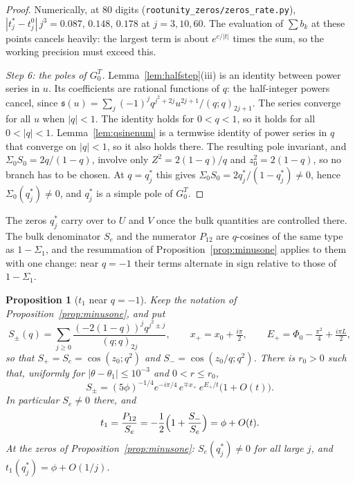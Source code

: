 \documentclass[11pt]{article}
\theoremstyle{plain}
\newtheorem{proposition}[theorem]{Proposition}
\theoremstyle{definition}
\theoremstyle{remark}
\theoremstyle{plain}\newtheorem*{maintheorem}{Main Theorem}
\begin{document}
\begin{proof}
Numerically, at $80$ digits (\texttt{rootunity\_zeros/zeros\_rate.py}),
$|t^\ast_j-t^0_j|\,j^3=0.087,\,0.148,\,0.178$ at $j=3,10,60$. The evaluation of $\sum b_k$ at
these points cancels heavily: the largest term is about $e^{c/|t|}$ times the sum, so the working
precision must exceed this.

\emph{Step 6: the poles of $G^T_0$.} Lemma~\ref{lem:halfstep}\textup{(iii)} is an identity
between power series in $u$. Its coefficients are rational functions of $q$: the half-integer
powers cancel, since $\mathfrak s(u)=\sum_j(-1)^jq^{j^2+2j}u^{2j+1}/(q;q)_{2j+1}$. The series
converge for all $u$ when $|q|<1$. The identity holds for $0<q<1$, so it holds for all $0<|q|<1$.
Lemma~\ref{lem:qsinenum} is a termwise identity of power series in $q$ that converge on $|q|<1$,
so it also holds there. The resulting pole invariant, and
$\Sigma_0S_0=2q/(1-q)$, involve only $Z^2=2(1-q)/q$ and $z_0^2=2(1-q)$, so no branch has to be
chosen. At $q=q^\ast_j$ this gives $\Sigma_0S_0=2q^\ast_j/(1-q^\ast_j)\ne0$, hence
$\Sigma_0(q^\ast_j)\ne0$, and $q^\ast_j$ is a simple pole of $G^T_0$.
\end{proof}

The zeros $q^\ast_j$ carry over to $U$ and $V$ once the bulk quantities are controlled there. The
bulk denominator $S_e$ and the numerator $P_{12}$ are $q$-cosines of the same type as $1-\Sigma_1$,
and the resummation of Proposition~\ref{prop:minusone} applies to them with one change: near $q=-1$
their terms alternate in sign relative to those of $1-\Sigma_1$.

\begin{proposition}[$t_1$ near $q=-1$]\label{prop:t1minusone}
Keep the notation of Proposition~\ref{prop:minusone}, and put
\[
   S_\pm(q)=\sum_{j\ge0}\frac{(-2(1-q))^jq^{j^2\pm j}}{(q;q)_{2j}},\qquad
   x_+=x_0+\tfrac{i\pi}2,\qquad E_+=\Phi_0-\tfrac{\pi^2}4+\tfrac{i\pi L}2 ,
\]
so that $S_+=S_e=\cos(z_0;q^2)$ and $S_-=\cos(z_0/q;q^2)$. There is $r_0>0$ such that, uniformly for
$|\theta-\theta_1|\le10^{-3}$ and $0<r\le r_0$,
\begin{equation}\label{eq:Spmasym}
   S_\pm=(5\phi)^{-1/4}e^{-i\pi/4}\,e^{\mp x_+}\,e^{E_+/t}\bigl(1+O(t)\bigr).
\end{equation}
In particular $S_e\ne0$ there, and
\[
   t_1=\frac{P_{12}}{S_e}=-\frac12\Bigl(1+\frac{S_-}{S_e}\Bigr)=\phi+O(t).
\]
At the zeros of Proposition~\ref{prop:minusone}: $S_e(q^\ast_j)\ne0$ for all large $j$, and
$t_1(q^\ast_j)=\phi+O(1/j)$.
\end{proposition}
\end{document}
